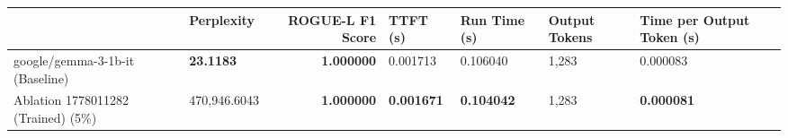 \begin{table}[H]
\label{tab:evaluation-pipeline-13}
\begin{tabular}{llrllll}
\toprule
 & Perplexity & ROGUE-L F1 Score & TTFT (s) & Run Time (s) & Output Tokens & Time per Output Token (s) \\
\midrule
google/gemma-3-1b-it (Baseline) & \bfseries 23.1183 & \bfseries 1.000000 & 0.001713 & 0.106040 & 1,283 & 0.000083 \\
Ablation 1778011282 (Trained) (5\%) & \color{red} 470,946.6043 & \bfseries \color{red} 1.000000 & \bfseries \color{red} 0.001671 & \bfseries \color{red} 0.104042 & \color{red} 1,283 & \bfseries \color{red} 0.000081 \\
\bottomrule
\end{tabular}
\end{table}

